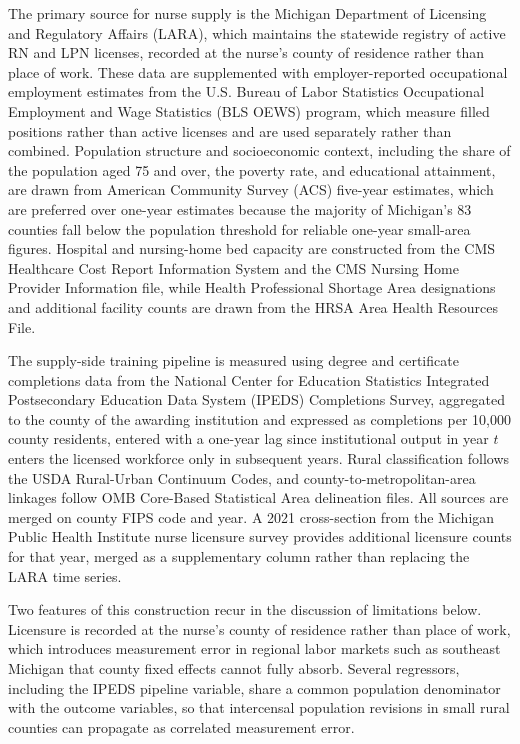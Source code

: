 \documentclass[12pt]{article}
\begin{document}
The primary source for nurse supply is the Michigan Department of Licensing and Regulatory Affairs (LARA), which maintains the statewide registry of active RN and LPN licenses, recorded at the nurse's county of residence rather than place of work. These data are supplemented with employer-reported occupational employment estimates from the U.S. Bureau of Labor Statistics Occupational Employment and Wage Statistics (BLS OEWS) program, which measure filled positions rather than active licenses and are used separately rather than combined. Population structure and socioeconomic context, including the share of the population aged 75 and over, the poverty rate, and educational attainment, are drawn from American Community Survey (ACS) five-year estimates, which are preferred over one-year estimates because the majority of Michigan's 83 counties fall below the population threshold for reliable one-year small-area figures. Hospital and nursing-home bed capacity are constructed from the CMS Healthcare Cost Report Information System and the CMS Nursing Home Provider Information file, while Health Professional Shortage Area designations and additional facility counts are drawn from the HRSA Area Health Resources File.

The supply-side training pipeline is measured using degree and certificate completions data from the National Center for Education Statistics Integrated Postsecondary Education Data System (IPEDS) Completions Survey, aggregated to the county of the awarding institution and expressed as completions per 10{,}000 county residents, entered with a one-year lag since institutional output in year $t$ enters the licensed workforce only in subsequent years. Rural classification follows the USDA Rural-Urban Continuum Codes, and county-to-metropolitan-area linkages follow OMB Core-Based Statistical Area delineation files. All sources are merged on county FIPS code and year. A 2021 cross-section from the Michigan Public Health Institute nurse licensure survey provides additional licensure counts for that year, merged as a supplementary column rather than replacing the LARA time series.

Two features of this construction recur in the discussion of limitations below. Licensure is recorded at the nurse's county of residence rather than place of work, which introduces measurement error in regional labor markets such as southeast Michigan that county fixed effects cannot fully absorb. Several regressors, including the IPEDS pipeline variable, share a common population denominator with the outcome variables, so that intercensal population revisions in small rural counties can propagate as correlated measurement error.
\end{document}
